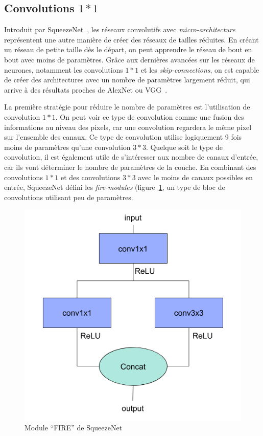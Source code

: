 \subsection{Convolutions $1*1$}

Introduit par SqueezeNet~\cite{iandola2016squeezenet}, les réseaux convolutifs avec \textit{micro-architecture} représentent une autre manière de créer des réseaux de tailles réduites.
En créant un réseau de petite taille dès le départ, on peut apprendre le réseau de bout en bout avec moins de paramètres.
Grâce aux dernières avancées sur les réseaux de neurones, notamment les convolutions $1*1$ et les \textit{skip-connections}, on est capable de créer des architectures avec un nombre de paramètres largement réduit, qui arrive à des résultats proches de AlexNet ou VGG~\cite{iandola2016squeezenet, howard2017mobilenets}.

La première stratégie pour réduire le nombre de paramètres est l'utilisation de convolution $1*1$. 
On peut voir ce type de convolution comme une fusion des informations au niveau des pixels, car une convolution regardera le même pixel sur l'ensemble des canaux.
Ce type de convolution utilise logiquement 9 fois moins de paramètres qu'une convolution $3*3$. 
Quelque soit le type de convolution, il est également utile de s'intéresser aux nombre de canaux d'entrée, car ils vont déterminer le nombre de paramètres de la couche.
En combinant des convolutions $1*1$ et des convolutions $3*3$ avec le moins de canaux possibles en entrée, SqueezeNet défini les \textit{fire-modules} (figure~\ref{fig:firemodule}, un type de bloc de convolutions utilisant peu de paramètres.



\begin{figure}%
\centering
\includegraphics[width=.55\columnwidth]{figures/FireModule.png}%
\caption{Module ``FIRE'' de SqueezeNet~\cite{iandola2016squeezenet}}%
\label{fig:firemodule}%
\end{figure}



